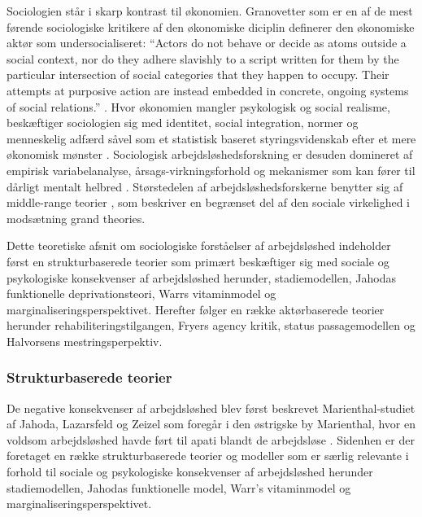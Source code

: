 Sociologien står i skarp kontrast til økonomien. Granovetter som er en af de mest førende sociologiske kritikere af den økonomiske diciplin definerer den økonomiske aktør som undersocialiseret: “Actors do not behave or decide as atoms outside a social context, nor do they adhere slavishly to a script written for them by the particular intersection of social categories that they happen to occupy. Their attempts at purposive action are instead embedded in concrete, ongoing systems of social relations.” \parencite[487]{Granovetter1985}. Hvor økonomien mangler psykologisk og social realisme, beskæftiger sociologien sig med identitet, social integration, normer og menneskelig adfærd såvel som et statistisk baseret styringsvidenskab efter et mere økonomisk mønster \parencite[36]{Halvorsen1999}. Sociologisk arbejdsløshedsforskning er desuden domineret af empirisk variabelanalyse, årsags-virkningsforhold og mekanismer som kan fører til dårligt mentalt helbred \parencite[38]{Halvorsen1999}. Størstedelen af arbejdsløshedsforskerne benytter sig af middle-range teorier \parencite[9]{Hedstroem2005}, som beskriver en begrænset del af den sociale virkelighed i modsætning grand theories. %

Dette teoretiske afsnit om sociologiske forståelser af arbejdsløshed indeholder først en strukturbaserede teorier som primært beskæftiger sig med sociale og psykologiske konsekvenser af arbejdsløshed herunder, stadiemodellen, Jahodas funktionelle deprivationsteori, Warrs vitaminmodel og marginaliseringsperspektivet. Herefter følger en række aktørbaserede teorier herunder rehabiliteringstilgangen, Fryers agency kritik, status passagemodellen og Halvorsens mestringsperpektiv. 


\subsubsection{Strukturbaserede teorier}

De negative konsekvenser af arbejdsløshed blev først beskrevet Marienthal-studiet af Jahoda, Lazarsfeld og Zeizel som foregår i den østrigske by Marienthal, hvor en voldsom arbejdsløshed havde ført til apati blandt de arbejdsløse \parencite[vii]{Lazarsfeld1971}. Sidenhen er der foretaget en række strukturbaserede teorier og modeller som er særlig relevante i forhold til sociale og psykologiske konsekvenser af arbejdsløshed herunder stadiemodellen, Jahodas funktionelle model, Warr's vitaminmodel og marginaliseringsperspektivet.

